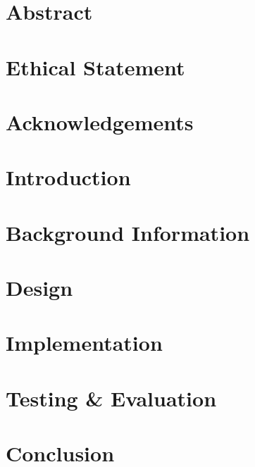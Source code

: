 \documentclass[12pt]{article}
\begin{document}
\section*{Abstract}


\section*{Ethical Statement}


\section*{Acknowledgements}


\section{Introduction}
\label{introduction}


\section{Background Information}
\label{background}


\section{Design}
\label{design}


\section{Implementation}
\label{implementation}


\section{Testing \& Evaluation}
\label{testing}


\section{Conclusion}
\label{conclusion}

\end{document}
